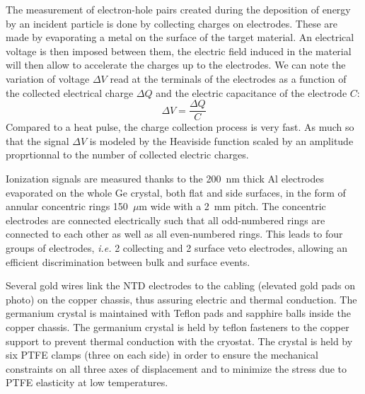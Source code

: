 The measurement of electron-hole pairs created during the deposition of energy by an incident particle is done by collecting charges on electrodes. These are made by evaporating a metal on the surface of the target material. An electrical voltage is then imposed between them, the electric field induced in the material will then allow to accelerate the charges up to the electrodes. We can note the variation of voltage $\Delta V$ read at the terminals of the electrodes as a function of the collected electrical charge $\Delta Q$ and the electric capacitance of the electrode $C$: 
\begin{equation}
\Delta V = \frac{\Delta Q}{C}
\end{equation}
Compared to a heat pulse, the charge collection process is very fast. As much so that the signal $\Delta V$ is modeled by the Heaviside function scaled by an amplitude proprtionnal to the number of collected electric charges.

Ionization signals are measured thanks to the 200~nm thick Al electrodes  evaporated on the whole Ge crystal, both flat and side surfaces, in the form of annular concentric rings 150~$\mu$m wide with a 2~mm pitch. The concentric electrodes are connected electrically such that all odd-numbered rings are connected to each other as well as all even-numbered rings. This leads to four groups of electrodes, {\it i.e.} 2 collecting and 2 surface veto electrodes, allowing an efficient discrimination between bulk and surface events.


Several gold wires link the NTD electrodes to the cabling (elevated gold pads on photo) on the copper chassis, thus assuring electric and thermal conduction. The germanium crystal is maintained with Teflon pads and sapphire balls inside the copper chassis.
The germanium crystal is held by teflon fasteners to the copper support to prevent thermal conduction with the cryostat.
The crystal is held by six PTFE clamps (three on each side) in order to ensure the mechanical constraints on all three axes of displacement and to minimize the stress due to PTFE elasticity at low temperatures. 


